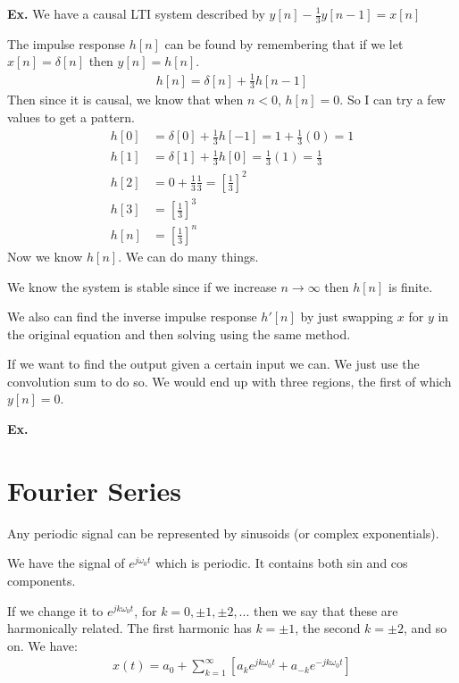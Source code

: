 \documentclass[12pt,letterpaper]{article} \usepackage{amsmath} \usepackage{graphicx} \usepackage[margin=1in]{geometry} \usepackage{longtable}  \usepackage{amssymb}
\begin{document}
	\begin{mdframed}
		\textbf{Ex. } We have a causal LTI system described by $y[n] - \frac{1}{3} y[n-1] = x[n]$
		
		The impulse response $h[n]$ can be found by remembering that if we let $x[n] = \delta[n]$ then $y[n]=h[n]$.
		\begin{align*}
			h[n] = \delta[n] + \frac{1}{3} h[n-1]
		\end{align*}
		Then since it is causal, we know that when $n<0$, $h[n]=0$. So I can try a few values to get a pattern.
		\begin{align*}
			h[0] &= \delta[0] + \frac{1}{3}h[-1] = 1 + \frac{1}{3} (0) = 1\\
			h[1] &= \delta[1] + \frac{1}{3}h[0] = \frac{1}{3} (1) = \frac{1}{3}\\
			h[2] &= 0 + \frac{1}{3} \frac{1}{3} = \left[\frac{1}{3}\right]^2\\
			h[3] &= \left[\frac{1}{3}\right]^3\\
			h[n] &= \left[\frac{1}{3}\right]^n
		\end{align*}
		Now we know $h[n]$. We can do many things. 
		
		We know the system is stable since if we increase $n \to \infty$ then $h[n]$ is finite. 
		
		We also can find the inverse impulse response $h'[n]$ by just swapping $x$ for $y$ in the original equation and then solving using the same method. 
		
		If we want to find the output given a certain input we can. We just use the convolution sum to do so. We would end up with three regions, the first of which $y[n]=0$.
	\end{mdframed}
	
	\begin{mdframed}
		\textbf{Ex. } %
	\end{mdframed}
	\section{Fourier Series}
	Any periodic signal can be represented by sinusoids (or complex exponentials).
	
	We have the signal of $e^{j\omega_0t}$ which is periodic. It contains both sin and cos components. 
	
	If we change it to $e^{jk\omega_0 t}$, for $k=0, \pm1, \pm2, ...$ then we say that these are harmonically related. The first harmonic has $k=\pm1$, the second $k=\pm2$, and so on. We have:
	\begin{align}
		x(t) = a_0 + \sum^{\infty}_{k=1} \left[a_k e^{jk\omega_0t} + a_{-k}e^{-jk\omega_0t}\right]
	\end{align}
	
\end{document}
